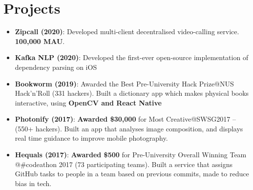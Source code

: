\documentclass[letterpaper,11pt]{article}
\newcommand{\resumeItem}[1]{
  \item\small{ #1 \vspace{-3pt}}
}
\newcommand{\resumeSubItem}[1]{\resumeItem{#1}\vspace{-4pt}}
\newcommand{\resumeSubHeadingListStart}{\begin{itemize}[leftmargin=*]}
\newcommand{\resumeSubHeadingListEnd}{\end{itemize}}
\begin{document}
\section{Projects}
  \resumeSubHeadingListStart
  	\resumeSubItem{\textbf{Zipcall (2020)}: Developed multi-client decentralised video-calling service. \textbf{100,000 MAU}.}
	\resumeSubItem{\textbf{Kafka NLP (2020)}: Developed the first-ever open-source implementation of dependency parsing on iOS}
	\resumeSubItem{\textbf{Bookworm (2019)}: Awarded the Best Pre-University Hack Prize@NUS Hack'n'Roll (331 hackers). Built a dictionary app which makes physical books interactive, using \textbf{OpenCV and React Native}}
	\resumeSubItem{\textbf{Photonify (2017)}: \textbf{Awarded \$30,000} for Most Creative@SWSG2017 – (550+ hackers). Built an app that analyses image composition, and displays real time guidance to improve mobile photography.} 
	\resumeSubItem{\textbf{Hequals (2017)}: \textbf{Awarded \$500} for Pre-University Overall Winning Team @\#codeathon 2017 (73 participating teams). Built a service that assigns GitHub tasks to people in a team based on previous commits, made to reduce bias in tech.} 
	\resumeSubHeadingListEnd 

%


\end{document}
